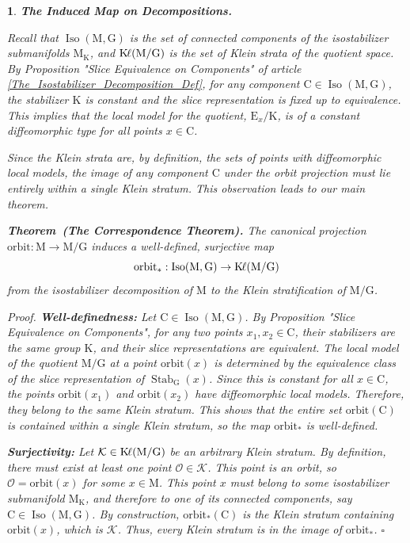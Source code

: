 \documentclass[10pt,reqno,letterpaper,twoside]{amsart}
\theoremstyle{article}
\newtheorem{article}{}
\def\artlabel[#1]{\textbf{#1.}}
\newenvironment{theorem}[1]%
{\noindent\textbf{Theorem#1.} \it}%
{}
\renewenvironment{proof}%
{\noindent\textit{Proof.}}%
{\nolinebreak\hfill $\square$}
\newcommand{\cO}{{\mathcal O}}
\def \C{\mathrm C}
\def \E{\mathrm E}
\def \G{\mathrm G}
\def \K{\mathrm K}
\def \M{\mathrm M}
\DeclareMathOperator{\Iso}{Iso}
\DeclareMathOperator{\Kl}{{\K\hspace{-1pt}\ell}}
\DeclareMathOperator{\Stab}{Stab}
\newcommand{\orbit}{{\mathrm{orbit}}}
\begin{document}
  \begin{article}
    \artlabel[The Induced Map on Decompositions]
    \label{Induced_Map}
    
    Recall that $\Iso(\M,\G)$ is the set of connected components of the isostabilizer submanifolds $\M_\K$,
    and $\Kl(\M/\G)$ is the set of Klein strata of the quotient space.
    By Proposition "Slice Equivalence on Components" of article \ref{The_Isostabilizer_Decomposition_Def},
    for any component $\C \in \Iso(\M,\G)$,
    the stabilizer $\K$ is constant and the slice representation is fixed up to equivalence.
    This implies that the local model for the quotient, $\E_x/\K$,
    is of a constant diffeomorphic type for all points $x \in \C$.
    
    Since the Klein strata are,
    by definition,
    the sets of points with diffeomorphic local models,
    the image of any component $\C$ under the orbit projection must lie entirely within a single Klein stratum.
    This observation leads to our main theorem.
    
    \begin{theorem}{~(The Correspondence Theorem)}
      \label{thm:correspondence}
      The canonical projection $\orbit : \M \to \M/\G$ induces a well-defined,
      surjective map
      $$
        \orbit_* : \Iso(\M,\G) \to \Kl(\M/\G)
        $$
      from the isostabilizer decomposition of $\M$ to the Klein stratification of $\M/\G$.
    \end{theorem}
    
    \begin{proof}
      \textbf{Well-definedness:} Let $\C \in \Iso(\M,\G)$.
      By Proposition "Slice Equivalence on Components",
      for any two points $x_1, x_2 \in \C$,
      their stabilizers are the same group $\K$,
      and their slice representations are equivalent.
      The local model of the quotient $\M/\G$ at a point $\orbit(x)$ is determined by the equivalence class of the slice representation of $\Stab_\G(x)$.
      Since this is constant for all $x \in \C$,
      the points $\orbit(x_1)$ and $\orbit(x_2)$ have diffeomorphic local models.
      Therefore,
      they belong to the same Klein stratum.
      This shows that the entire set $\orbit(\C)$ is contained within a single Klein stratum, so the map $\orbit_*$ is well-defined.
      
      \textbf{Surjectivity:} Let $\mathcal{K} \in \Kl(\M/\G)$ be an arbitrary Klein stratum.
      By definition,
      there must exist at least one point $\cO \in \mathcal{K}$.
      This point is an orbit,
      so $\cO = \orbit(x)$ for some $x \in \M$.
      This point $x$ must belong to some isostabilizer submanifold $\M_\K$,
      and therefore to one of its connected components,
      say $\C \in \Iso(\M,\G)$.
      By construction, $\orbit_*(\C)$ is the Klein stratum containing $\orbit(x)$,
      which is $\mathcal{K}$.
      Thus, every Klein stratum is in the image of $\orbit_*$.
    \end{proof}
    
  \end{article}
  
\end{document}
